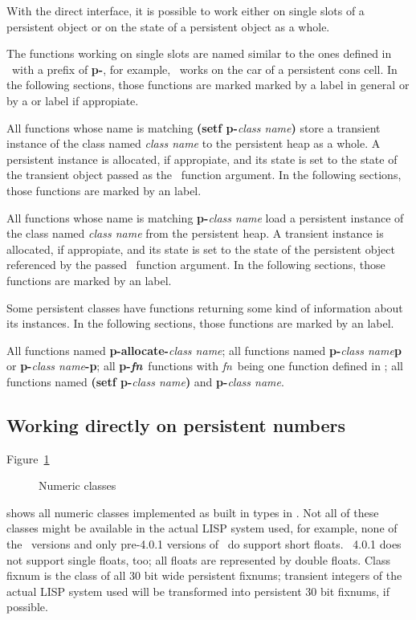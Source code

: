 With the direct interface, it is possible to work either on single
slots of a persistent object or on the state of a persistent object as
a whole.

The functions working on single slots are named similar to the ones
defined in \cite{bib:CLtLII}\ with a prefix of \textbf{p-}, for
example, \ works on the car of a persistent cons cell. In
the following sections, those functions are marked marked by a
\textbf{\SlotAccessorLabel} label in general or by a
\textbf{\SlotReaderLabel} or \textbf{\SlotWriterLabel} label if
appropiate.

All functions whose name is matching \textbf{(setf p-}\emph{\lt{}class
  name\gt}\textbf{)} store a transient instance of the class named
\emph{\lt{}class name\gt} to the persistent heap as a whole. A
persistent instance is allocated, if appropiate, and its state is set
to the state of the transient object passed as the \ 
function argument.  In the following sections, those functions are
marked by an \textbf{\ObjectStoreLabel} label.

All functions whose name is matching \textbf{p-}\emph{\lt{}class
  name\gt} load a persistent instance of the class named
\emph{\lt{}class name\gt} from the persistent heap. A transient
instance is allocated, if appropiate, and its state is set to the
state of the persistent object referenced by the passed \objid\ 
function argument.  In the following sections, those functions are
marked by an \textbf{\ObjectLoadLabel} label.

Some persistent classes have functions returning some kind of
information about its instances. In the following sections, those
functions are marked by an \textbf{\InformationLabel} label.

 All functions named \textbf{p-allocate-}\emph{\lt{}class
  name\gt}; all functions named \textbf{p-}\emph{\lt{}class
  name\gt}\textbf{p} or \textbf{p-}\emph{\lt{}class
  name\gt}\textbf{-p}; all \textbf{p-\hbox{\lt\emph{fn}\gt}}\ 
functions with \lt\emph{fn}\gt\ being one function defined in
\cite{bib:CLtLII}; all functions named \textbf{(setf p-}\emph{\lt{}class
  name\gt}\textbf{)} and \textbf{p-}\emph{\lt{}class name\gt}.

\subsection[Persistent numbers]{Working directly on persistent
  numbers}

Figure~\ref{fig:NumericClasses} %
\begin{figure}[htbp]
\centerline{}
\caption{Numeric classes}%
\label{fig:NumericClasses}
\end{figure}%
shows all numeric classes implemented as built in types in
\plobwoexcl. Not all of these classes might be available in the actual
LISP system used, for example, none of the \allegrocl\ versions and
only pre-4.0.1 versions of \lwcl\ do support short floats. \lwcl\ 
4.0.1 does not support single floats, too; all floats are represented
by double floats. Class fixnum is the class of all 30 bit wide
persistent fixnums; transient integers of the actual LISP system used
will be transformed into persistent 30 bit fixnums, if possible.

